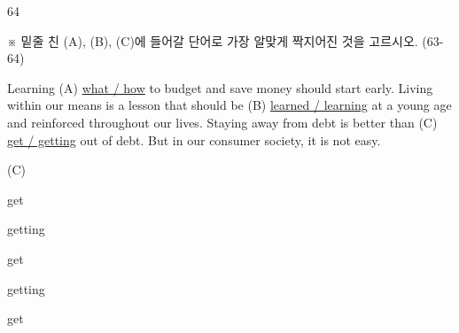 \begin{question}{64}
\begin{framedtext}
※ 밑줄 친 (A), (B), (C)에 들어갈 단어로 가장 알맞게 짝지어진 것을 고르시오. (63-64) \par
\end{framedtext}
Learning (A) \uline{what / how} to budget and save money should start early. Living within our means is a lesson that should be (B) \uline{learned / learning} at a young age and  reinforced throughout our lives.  Staying away from debt is better than (C) \uline{get / getting} out of debt. But in our consumer society, it is not easy.
\begin{choices}
  \item[] \makebox[1.5em]{}\makebox[1.5em]{}(C)
  \item {}get
  \item {}getting
  \item {}get
  \item {}getting
  \item {}get
\end{choices}
\end{question}
